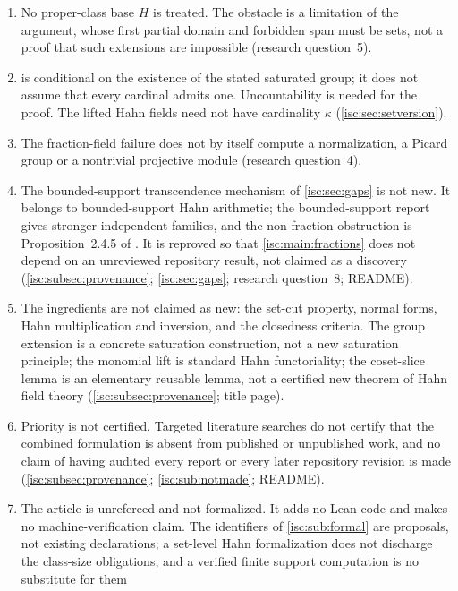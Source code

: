 \documentclass[11pt,letterpaper]{article}
\theoremstyle{definition}
\theoremstyle{remark}
\numberwithin{equation}{section}
\begin{document}
\begin{enumerate}[label=S\arabic*.,leftmargin=2.6em,itemsep=2pt]
so they cannot be relabelled as solutions in richer languages
(\cref{isc:warn:omega}; \cref{isc:sec:explicit}; research question~6;
\cref{isc:sub:notmade}).
\item No proper-class base $H$ is treated. The obstacle is a limitation of
the argument, whose first partial domain and forbidden span must be sets,
not a proof that such extensions are impossible (research question~5).
\item {} is conditional on the existence of the
stated saturated group; it does not assume that every cardinal admits one.
Uncountability is needed for the proof. The lifted Hahn fields need not have
cardinality $\kappa$ (\cref{isc:sec:setversion}).
\item The fraction-field failure does not by itself compute a
normalization, a Picard group or a nontrivial projective module
(research question~4).
\item The bounded-support transcendence mechanism of \cref{isc:sec:gaps}
is not new. It belongs to bounded-support Hahn arithmetic; the
bounded-support report gives stronger independent families, and the
non-fraction obstruction is Proposition~2.4.5 of \cite{LM}. It is reproved
so that \cref{isc:main:fractions} does not depend on an unreviewed
repository result, not claimed as a discovery
(\cref{isc:subsec:provenance}; \cref{isc:sec:gaps}; research question~8;
README).
\item The ingredients are not claimed as new: the set-cut property, normal
forms, Hahn multiplication and inversion, and the closedness criteria. The
group extension is a concrete saturation construction, not a new saturation
principle; the monomial lift is standard Hahn functoriality; the coset-slice
lemma is an elementary reusable lemma, not a certified new theorem of Hahn
field theory (\cref{isc:subsec:provenance}; title page).
\item Priority is not certified. Targeted literature searches do not certify
that the combined formulation is absent from published or unpublished work,
and no claim of having audited every report or every later repository
revision is made (\cref{isc:subsec:provenance}; \cref{isc:sub:notmade};
README).
\item The article is unrefereed and not formalized. It adds no Lean code and
makes no machine-verification claim. The identifiers of
\cref{isc:sub:formal} are proposals, not existing declarations; a set-level
Hahn formalization does not discharge the class-size obligations, and a
verified finite support computation is no substitute for them

\end{enumerate}
\end{document}
